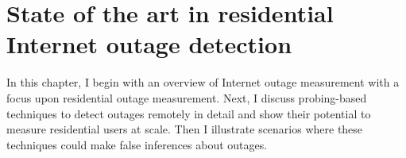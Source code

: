 
\chapter{State of the art in residential Internet outage detection}

\label{cpt:bg}

In this chapter, I begin with an overview of Internet outage
measurement with a focus upon residential outage measurement. Next, I
discuss probing-based techniques to detect outages remotely in detail
and show their potential to measure residential users at scale. Then I
illustrate scenarios where these techniques could make false
inferences about outages.










